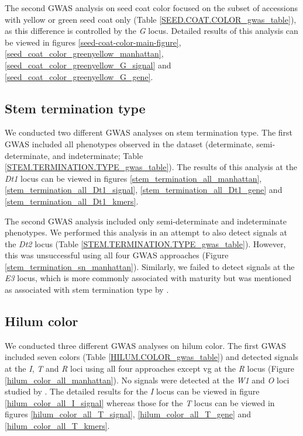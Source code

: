 The second GWAS analysis on seed coat color focused on the subset of accessions
with yellow or green seed coat only (Table \ref{SEED.COAT.COLOR_gwas_table}),
as this difference is controlled by the \emph{G} locus. Detailed results of
this analysis can be viewed in figures \ref{seed-coat-color-main-figure},
\ref{seed_coat_color_greenyellow_manhattan},
\ref{seed_coat_color_greenyellow_G_signal} and
\ref{seed_coat_color_greenyellow_G_gene}.

\subsection*{Stem termination type}
\label{sv-gwas-stem-termination}

We conducted two different GWAS analyses on stem termination type. The first GWAS
included all phenotypes observed in the dataset (determinate, semi-determinate,
and indeterminate; Table \ref{STEM.TERMINATION.TYPE_gwas_table}). The results
of this analysis at the \textit{Dt1} locus can be viewed in figures \ref{stem_termination_all_manhattan},
\ref{stem_termination_all_Dt1_signal}, \ref{stem_termination_all_Dt1_gene} and
\ref{stem_termination_all_Dt1_kmers}.

The second GWAS analysis included only
semi-determinate and indeterminate phenotypes. We performed this analysis in an attempt to also detect signals
at the \emph{Dt2} locus (Table \ref{STEM.TERMINATION.TYPE_gwas_table}).
However, this was unsuccessful using all four GWAS
approaches (Figure \ref{stem_termination_sn_manhattan}). Similarly, we failed to
detect signals at the \textit{E3} locus, which is more commonly associated
with maturity but was mentioned as associated with stem termination type by
\cite{bandillo2017}.

\subsection*{Hilum color}
\label{sv-gwas-hilum-color}

We conducted three different GWAS analyses on hilum color. The first GWAS
included seven colors (Table \ref{HILUM.COLOR_gwas_table}) and detected signals
at the \emph{I}, \emph{T} and \emph{R} loci using all four approaches except vg
at the \emph{R} locus (Figure \ref{hilum_color_all_manhattan}). No signals
were detected at the \emph{W1} and \emph{O} loci studied by
\cite{bandillo2017}. The detailed results for the \textit{I} locus can be viewed
in figure \ref{hilum_color_all_I_signal} whereas those for the \textit{T} locus
can be viewed in figures \ref{hilum_color_all_T_signal}, \ref{hilum_color_all_T_gene}
and \ref{hilum_color_all_T_kmers}.

